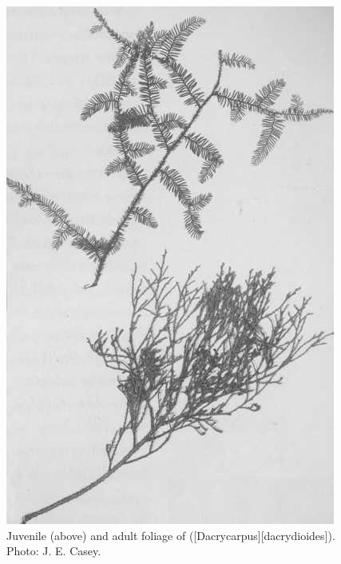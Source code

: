\begin{figure}[!htb]
\begin{minipage}[t]{0.487\textwidth}
    	\includegraphics[width=\textwidth]{graphics/figure22kahikatea.jpg}
    	\caption[Kahikatea foliage]{Juvenile (above) and adult foliage of  ([Dacrycarpus][dacrydioides]).
    	Photo: J. E. Casey.}%
    	\label{fig:22kahikatea}
	\end{minipage}
\end{figure}

